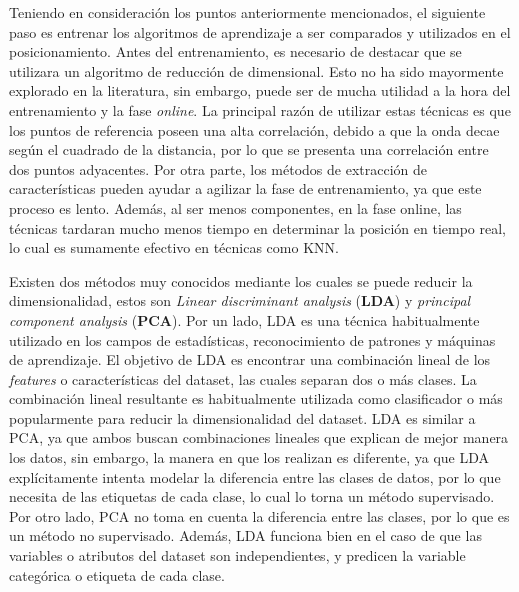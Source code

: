 Teniendo en consideración los puntos anteriormente mencionados, el siguiente paso es entrenar los algoritmos de aprendizaje a ser comparados y utilizados en el posicionamiento. Antes del entrenamiento, es necesario de destacar que se utilizara un algoritmo de reducción de dimensional. Esto no ha sido mayormente explorado en la literatura, sin embargo, puede ser de mucha utilidad a la hora del entrenamiento y la fase \textit{online}. La principal razón de utilizar estas técnicas es que los puntos de referencia poseen una alta correlación, debido a que la onda decae según el cuadrado de la distancia, por lo que se presenta una correlación entre dos puntos adyacentes. Por otra parte, los métodos de extracción de características pueden ayudar a agilizar la fase de entrenamiento, ya que este proceso es lento. Además, al ser menos componentes, en la fase online, las técnicas tardaran mucho menos tiempo en determinar la posición en tiempo real, lo cual es sumamente efectivo en técnicas como KNN.

Existen dos métodos muy conocidos mediante los cuales se puede reducir la dimensionalidad, estos son \textit{Linear discriminant analysis}      (\textbf{LDA}) y \textit{principal component analysis} (\textbf{PCA}). Por un lado, LDA es una técnica habitualmente utilizado en los campos de estadísticas, reconocimiento de patrones y máquinas de aprendizaje. El objetivo de LDA es encontrar una combinación lineal de los \textit{features} o características del dataset, las cuales separan dos o más clases. La combinación lineal resultante es habitualmente utilizada como clasificador o más popularmente para reducir la dimensionalidad del dataset. LDA es similar a PCA, ya que ambos buscan combinaciones lineales que explican de mejor manera los datos, sin embargo, la manera en que los realizan es diferente, ya que LDA explícitamente intenta modelar la diferencia entre las clases de datos, por lo que necesita de las etiquetas de cada clase, lo cual lo torna un método supervisado. Por otro lado, PCA no toma en cuenta la diferencia entre las clases, por lo que es un método no supervisado. Además, LDA funciona bien en el caso de que las variables o atributos del dataset son independientes, y predicen la variable categórica o etiqueta de cada clase.

